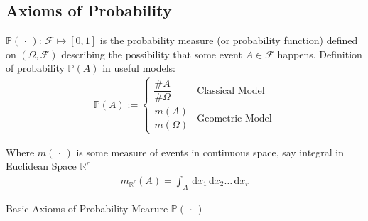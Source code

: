 \subsection{Axioms of Probability}

    $\mathbb{P}(\,\cdot\,):\,\mathscr{F}\mapsto [0,1]$ is the probability measure (or probability function) defined on $(\Omega,\mathscr{F})$ describing the possibility that some event $ A\in\mathscr{F}  $ happens. Definition of probability $ \mathbb{P}(A) $ in useful models:
    \begin{align}
       \mathbb{P}\left( A \right) :=\begin{cases}
            \dfrac{\#A}{\#\Omega }&\text{Classical Model}\\
            \dfrac{m(A)}{m(\Omega )}&\text{Geometric Model}
        \end{cases}   
    \end{align}
    
    Where $ m(\, \cdot \, ) $ is some measure of events in continuous space, say integral in Euclidean Space $ \mathbb{R}^r $
    \begin{align}
        m_\mathrm{\mathbb{R}^r}(A)=\int_A \,\mathrm{d}x_1\,\mathrm{d}x_2\ldots\,\mathrm{d}x_r  
    \end{align}
    
    
    
    

    
    
    
\begin{point}
    Basic Axioms of Probability Mearure $ \mathbb{P}(\,\cdot\,) $
\end{point}

